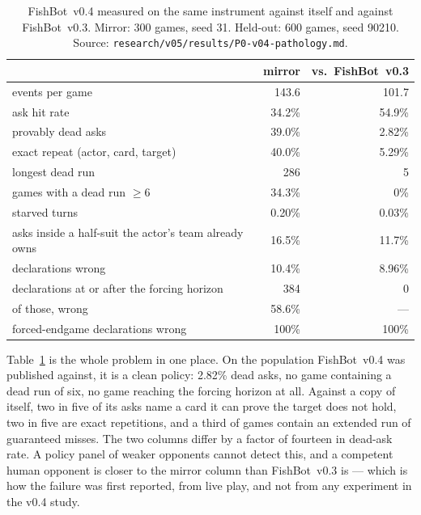 \documentclass[11pt]{article}
\theoremstyle{definition}
\DeclareRobustCommand{\vfour}{\texorpdfstring{\mbox{FishBot v0.4}}{FishBot v0.4}}
\DeclareRobustCommand{\vthree}{\texorpdfstring{\mbox{FishBot v0.3}}{FishBot v0.3}}
\providecommand{\numMirrorGames}{300}
\providecommand{\numMirrorEvents}{143.6}
\providecommand{\numMirrorHit}{34.2}
\providecommand{\numDeadAsk}{39.0}
\providecommand{\numRepeatAsk}{40.0}
\providecommand{\numDeadRunLongest}{286}
\providecommand{\numDeadRunGames}{34.3}
\providecommand{\numStarved}{0.20}
\providecommand{\numOwnLocked}{16.5}
\providecommand{\numDeclWrong}{10.4}
\providecommand{\numPostHorizonDecl}{384}
\providecommand{\numPostHorizonWrong}{58.6}
\providecommand{\numForcedWrongRate}{100}
\providecommand{\numVthreeEvents}{101.7}
\providecommand{\numVthreeHit}{54.9}
\providecommand{\numVthreeDeadAsk}{2.82}
\providecommand{\numVthreeRepeat}{5.29}
\providecommand{\numVthreeDeadRun}{5}
\providecommand{\numVthreeDeclWrong}{8.96}
\providecommand{\numVthreeDeadRunGames}{0}
\providecommand{\numVthreeStarved}{0.03}
\providecommand{\numVthreeOwnLocked}{11.7}
\begin{document}
\begin{table}[t]
\centering
\caption{\vfour{} measured on the same instrument against itself and against
\vthree{}. Mirror: \numMirrorGames{} games, seed 31. Held-out: 600 games, seed
90210. Source: \texttt{research/v05/results/P0-v04-pathology.md}.}
\label{tab:baseline}
\begin{tabular}{lrr}
\toprule
& \textbf{mirror} & \textbf{vs.\ \vthree{}} \\
\midrule
events per game                       & \numMirrorEvents{}   & \numVthreeEvents{} \\
ask hit rate                          & \numMirrorHit\%      & \numVthreeHit\% \\
provably dead asks                    & \numDeadAsk\%        & \numVthreeDeadAsk\% \\
exact repeat (actor, card, target)    & \numRepeatAsk\%      & \numVthreeRepeat\% \\
longest dead run                      & \numDeadRunLongest{} & \numVthreeDeadRun{} \\
games with a dead run $\geq 6$        & \numDeadRunGames\%   & \numVthreeDeadRunGames\% \\
starved turns                         & \numStarved\%        & \numVthreeStarved\% \\
asks inside a half-suit the actor's team already owns & \numOwnLocked\% & \numVthreeOwnLocked\% \\
declarations wrong                    & \numDeclWrong\%      & \numVthreeDeclWrong\% \\
declarations at or after the forcing horizon & \numPostHorizonDecl{} & 0 \\
\quad of those, wrong                 & \numPostHorizonWrong\% & --- \\
forced-endgame declarations wrong     & \numForcedWrongRate\% & \numForcedWrongRate\% \\
\bottomrule
\end{tabular}
\end{table}

Table~\ref{tab:baseline} is the whole problem in one place. On the population
\vfour{} was published against, it is a clean policy: \numVthreeDeadAsk\% dead
asks, no game containing a dead run of six, no game reaching the forcing horizon
at all. Against a copy of itself, two in five of its asks name a card it can
prove the target does not hold, two in five are exact repetitions, and a third of
games contain an extended run of guaranteed misses. The two columns differ by a
factor of fourteen in dead-ask rate. A policy panel of weaker opponents cannot
detect this, and a competent human opponent is closer to the mirror column than
\vthree{} is --- which is how the failure was first reported, from live play, and
not from any experiment in the v0.4 study.
\end{document}
